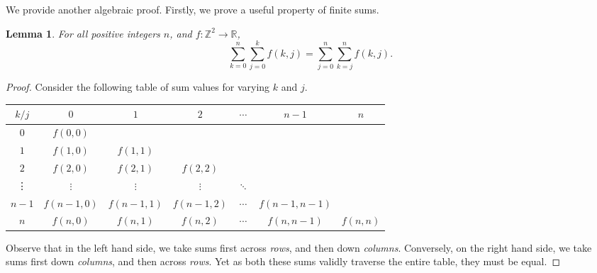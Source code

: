 \documentclass[12pt]{article}
\newtheorem*{lemma}{Lemma}
\begin{document}
We provide another algebraic proof.
Firstly, we prove a useful property of finite sums.
\begin{lemma}
	For all positive integers $n$, and $f: \mathbb{Z}^2 \to \mathbb{R}$,
	\begin{equation*}
		\boxed{\sum^{n}_{k=0}\sum^{k}_{j=0}f(k, j) = \sum^{n}_{j=0}\sum^{n}_{k=j}f(k, j).} \tag{$\phi$}
	\end{equation*}
\end{lemma}
\begin{proof}
	Consider the following table of sum values for varying $k$ and $j$.

	\begin{tabular}{c | c c c c c c}
		$k/j$  & $0$        & $1$        & $2$        & $\cdots$ & $n-1$         & $n$       \\
		\hline
		$0$    & $f(0, 0)$                                                                   \\
		$1$    & $f(1,0)$   & $f(1,1)$                                                       \\
		$2$    & $f(2,0)$   & $f(2,1)$   & $f(2,2)$                                          \\
		\vdots & $\vdots$   & $\vdots$   & $\vdots$   & $\ddots$                             \\
		$n-1$  & $f(n-1,0)$ & $f(n-1,1)$ & $f(n-1,2)$ & $\cdots$ & $f(n-1, n-1)$             \\
		$n$    & $f(n,0)$   & $f(n,1)$   & $f(n,2)$   & $\cdots$ & $f(n, n-1)$   & $f(n, n)$
	\end{tabular}

	Observe that in the left hand side, we take sums first across \textit{rows}, and then down \textit{columns}.
	Conversely, on the right hand side, we take sums first down \textit{columns}, and then across \textit{rows}.
	Yet as both these sums validly traverse the entire table, they must be equal.
\end{proof}
\end{document}
